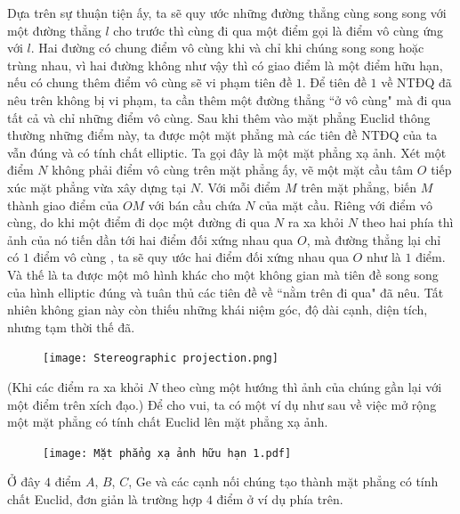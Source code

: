 \begin{multicols}{2}
	\vskip 0.1cm
	Dựa trên sự thuận tiện ấy, ta sẽ quy ước những đường thẳng cùng song song với một đường thẳng $l$ cho trước thì cùng đi qua một điểm gọi là điểm vô cùng ứng với $l$. Hai đường có chung điểm vô cùng khi và chỉ khi chúng song song hoặc trùng nhau, vì hai đường không như vậy thì có giao điểm là một điểm hữu hạn, nếu có chung thêm điểm vô cùng sẽ vi phạm tiên đề $1$. Để tiên đề $1$ về NTĐQ đã nêu trên không bị vi phạm, ta cần thêm một đường thẳng ``ở vô cùng" mà đi qua tất cả và chỉ những điểm vô cùng. Sau khi thêm vào mặt phẳng Euclid thông thường những điểm này, ta được một mặt phẳng mà các tiên đề NTĐQ của ta vẫn đúng và có tính chất elliptic. Ta gọi đây là một mặt phẳng xạ ảnh.
	\vskip 0.1cm
	Xét một điểm $N$ không phải điểm vô cùng trên mặt phẳng ấy, vẽ một mặt cầu tâm $O$ tiếp xúc mặt phẳng vừa xây dựng tại $N$. Với mỗi điểm $M$ trên mặt phẳng, biến $M$ thành giao điểm của $OM$ với bán cầu chứa $N$ của mặt cầu. Riêng với điểm vô cùng, do khi một điểm đi dọc một đường đi qua $N$ ra xa khỏi $N$ theo hai phía thì ảnh của nó tiến dần tới hai điểm đối xứng nhau qua $O$, mà đường thẳng lại chỉ có $1$ điểm vô cùng , ta sẽ quy ước hai điểm đối xứng nhau qua $O$ như là $1$ điểm. Và thế là ta được một mô hình khác cho một không gian mà tiên đề song song của hình elliptic đúng và tuân thủ các tiên đề về ``nằm trên đi qua" đã nêu. Tất nhiên không gian này còn thiếu những khái niệm góc, độ dài cạnh, diện tích, nhưng tạm thời thế đã.
	\begin{figure}[H]
		\vspace*{-5pt}
		\centering
		\captionsetup{labelformat= empty, justification=centering}
		\texttt{[image: Stereographic projection.png]}
		\vspace*{-10pt}
	\end{figure}
	(Khi các điểm ra xa khỏi $N$ theo cùng một hướng thì ảnh của chúng gần lại với một điểm trên xích đạo.)
	\vskip 0.1cm
	Để cho vui, ta có một ví dụ như sau về việc mở rộng một mặt phẳng có tính chất Euclid lên mặt phẳng xạ ảnh.
	\begin{figure}[H]
		\vspace*{-5pt}
		\centering
		\captionsetup{labelformat= empty, justification=centering}
		\texttt{[image: Mặt phẳng xạ ảnh hữu hạn 1.pdf]}
		\vspace*{-10pt}
	\end{figure}
	Ở đây $4$ điểm $A$, $B$, $C$, Ge và các cạnh nối chúng tạo thành mặt phẳng có tính chất Euclid, đơn giản là trường hợp $4$ điểm ở ví dụ phía trên. 

\end{multicols}
